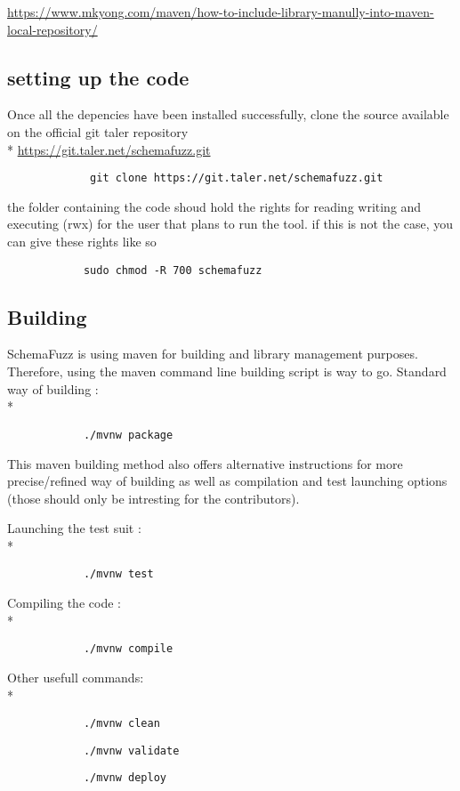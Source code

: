 \documentclass{article}
\begin{document}
			\url{https://www.mkyong.com/maven/how-to-include-library-manully-into-maven-local-repository/}
			
		\subsection{setting up the code}
			Once all the depencies have been installed successfully, clone the source available on the official git taler repository \\*
			\url{https://git.taler.net/schemafuzz.git}
			\begin{verbatim}
			 git clone https://git.taler.net/schemafuzz.git
			\end{verbatim}
			
the folder containing the code shoud hold the rights for reading writing and executing (rwx) for the user that plans to run the tool.
if this is not the case, you can give these rights like so
			\begin{verbatim}
			sudo chmod -R 700 schemafuzz
			\end{verbatim}
		\subsection{Building}
SchemaFuzz is using maven for building and library management purposes.
Therefore, using the maven command line building script is way to go.
Standard way of building :\\*
			\begin{verbatim}
			./mvnw package
			\end{verbatim}
				
This maven building method also offers alternative instructions for 	more precise/refined way of building as well as compilation and test 
launching options (those should only be intresting for the contributors).

Launching the test suit :\\*
			\begin{verbatim}
			./mvnw test
			\end{verbatim}
Compiling the code :\\*		
			\begin{verbatim}
			./mvnw compile
			\end{verbatim}
		
Other usefull commands: \\*		
		
			\begin{verbatim}
			./mvnw clean
			\end{verbatim}
			\begin{verbatim}
			./mvnw validate
			\end{verbatim}
			\begin{verbatim}
			./mvnw deploy
			\end{verbatim}
		
\end{document}
